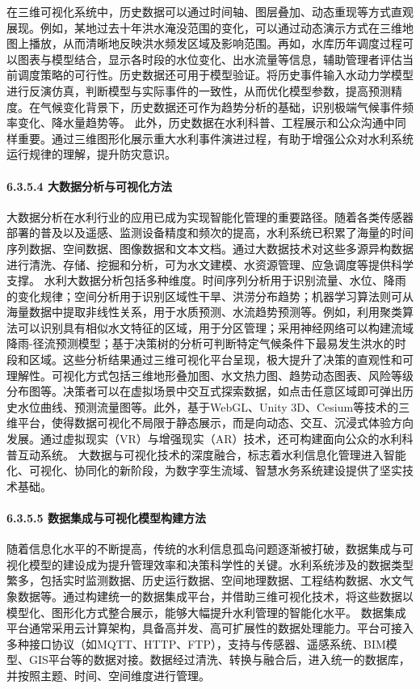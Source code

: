 在三维可视化系统中，历史数据可以通过时间轴、图层叠加、动态重现等方式直观展现。例如，某地过去十年洪水淹没范围的变化，可以通过动态演示方式在三维地图上播放，从而清晰地反映洪水频发区域及影响范围。再如，水库历年调度过程可以图表与模型结合，显示各时段的水位变化、出水流量等信息，辅助管理者评估当前调度策略的可行性。历史数据还可用于模型验证。将历史事件输入水动力学模型进行反演仿真，判断模型与实际事件的一致性，从而优化模型参数，提高预测精度。在气候变化背景下，历史数据还可作为趋势分析的基础，识别极端气候事件频率变化、降水量趋势等。 此外，历史数据在水利科普、工程展示和公众沟通中同样重要。通过三维图形化展示重大水利事件演进过程，有助于增强公众对水利系统运行规律的理解，提升防灾意识。 \paragraph{6.3.5.4 大数据分析与可视化方法}\label{ux5927ux6570ux636eux5206ux6790ux4e0eux53efux89c6ux5316ux65b9ux6cd5} 大数据分析在水利行业的应用已成为实现智能化管理的重要路径。随着各类传感器部署的普及以及遥感、监测设备精度和频次的提高，水利系统已积累了海量的时间序列数据、空间数据、图像数据和文本文档。通过大数据技术对这些多源异构数据进行清洗、存储、挖掘和分析，可为水文建模、水资源管理、应急调度等提供科学支撑。 水利大数据分析包括多种维度。时间序列分析用于识别流量、水位、降雨的变化规律；空间分析用于识别区域性干旱、洪涝分布趋势；机器学习算法则可从海量数据中提取非线性关系，用于水质预测、水流趋势预测等。例如，利用聚类算法可以识别具有相似水文特征的区域，用于分区管理；采用神经网络可以构建流域降雨-径流预测模型；基于决策树的分析可判断特定气候条件下最易发生洪水的时段和区域。这些分析结果通过三维可视化平台呈现，极大提升了决策的直观性和可理解性。可视化方式包括三维地形叠加图、水文热力图、趋势动态图表、风险等级分布图等。决策者可以在虚拟场景中交互式探索数据，如点击任意区域即可弹出历史水位曲线、预测流量图等。此外，基于WebGL、Unity 3D、Cesium等技术的三维平台，使得数据可视化不局限于静态展示，而是向动态、交互、沉浸式体验方向发展。通过虚拟现实（VR）与增强现实（AR）技术，还可构建面向公众的水利科普互动系统。 大数据与可视化技术的深度融合，标志着水利信息化管理进入智能化、可视化、协同化的新阶段，为数字孪生流域、智慧水务系统建设提供了坚实技术基础。 \paragraph{6.3.5.5 数据集成与可视化模型构建方法}\label{ux6570ux636eux96c6ux6210ux4e0eux53efux89c6ux5316ux6a21ux578bux6784ux5efaux65b9ux6cd5-1} 随着信息化水平的不断提高，传统的水利信息孤岛问题逐渐被打破，数据集成与可视化模型的建设成为提升管理效率和决策科学性的关键。水利系统涉及的数据类型繁多，包括实时监测数据、历史运行数据、空间地理数据、工程结构数据、水文气象数据等。通过构建统一的数据集成平台，并借助三维可视化技术，将这些数据以模型化、图形化方式整合展示，能够大幅提升水利管理的智能化水平。 数据集成平台通常采用云计算架构，具备高并发、高可扩展性的数据处理能力。平台可接入多种接口协议（如MQTT、HTTP、FTP），支持与传感器、遥感系统、BIM模型、GIS平台等的数据对接。数据经过清洗、转换与融合后，进入统一的数据库，并按照主题、时间、空间维度进行管理。 